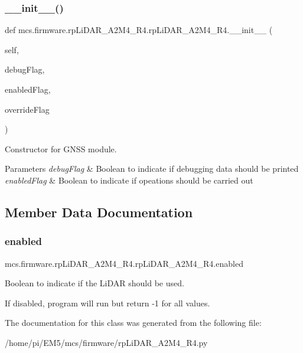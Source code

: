 \subsubsection{\texorpdfstring{\+\_\+\+\_\+init\+\_\+\+\_\+()}{\_\_init\_\_()}}
{\footnotesize\ttfamily def mcs.\+firmware.\+rp\+Li\+D\+A\+R\+\_\+\+A2\+M4\+\_\+\+R4.\+rp\+Li\+D\+A\+R\+\_\+\+A2\+M4\+\_\+\+R4.\+\_\+\+\_\+init\+\_\+\+\_\+ (\begin{DoxyParamCaption}\item[{}]{self,  }\item[{}]{debug\+Flag,  }\item[{}]{enabled\+Flag,  }\item[{}]{override\+Flag }\end{DoxyParamCaption})}



Constructor for G\+N\+SS module. 


\begin{DoxyParams}{Parameters}
{\em debug\+Flag} & Boolean to indicate if debugging data should be printed \\
\hline
{\em enabled\+Flag} & Boolean to indicate if opeations should be carried out \\
\hline
\end{DoxyParams}


\subsection{Member Data Documentation}
\mbox{\label{classmcs_1_1firmware_1_1rpLiDAR__A2M4__R4_1_1rpLiDAR__A2M4__R4_a7fadda01c63eaf93682605c352b17702}} 
\subsubsection{\texorpdfstring{enabled}{enabled}}
{\footnotesize\ttfamily mcs.\+firmware.\+rp\+Li\+D\+A\+R\+\_\+\+A2\+M4\+\_\+\+R4.\+rp\+Li\+D\+A\+R\+\_\+\+A2\+M4\+\_\+\+R4.\+enabled}



Boolean to indicate if the Li\+D\+AR should be used. 

If disabled, program will run but return -\/1 for all values. 

The documentation for this class was generated from the following file\+:\begin{DoxyCompactItemize}
\item 
/home/pi/\+E\+M5/mcs/firmware/rp\+Li\+D\+A\+R\+\_\+\+A2\+M4\+\_\+\+R4.\+py\end{DoxyCompactItemize}
